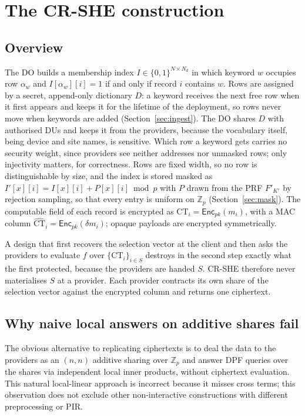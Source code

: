 \documentclass[a4paper,fleqn]{cas-sc}
\newcommand{\Enc}{\mathsf{Enc}}
\begin{document}
\section{The CR-SHE construction}
\label{sec:construction}

\subsection{Overview}
The DO builds a membership index $I\in\{0,1\}^{N\times N_d}$ in which keyword
$w$ occupies row $\alpha_w$ and $I[\alpha_w][i]=1$ if and only if record $i$
contains $w$. Rows are assigned by a secret, append-only dictionary $D$: a
keyword receives the next free row when it first appears and keeps it for the
lifetime of the deployment, so rows never move when keywords are added
(Section~\ref{sec:ingest}). The DO shares $D$ with authorised DUs and keeps it
from the providers, because the vocabulary itself, being device and site
names, is sensitive. Which row a keyword gets carries no security weight,
since providers see neither addresses nor unmasked rows; only injectivity
matters, for correctness. Rows are fixed width, so no row is distinguishable
by size, and the index is stored masked as $I'[x][i]=I[x][i]+P[x][i]\bmod p$
with $P$ drawn from the PRF $F'_{K'}$ by rejection sampling, so that every
entry is uniform on $\mathbb{Z}_p$ (Section~\ref{sec:mask}).
The computable field of each record is encrypted as
$\text{CT}_i=\Enc_{pk}(m_i)$, with a MAC column
$\widehat{\text{CT}}_i=\Enc_{pk}(\delta m_i)$; opaque payloads are encrypted
symmetrically.

A design that first recovers the selection vector at the client and then asks
the providers to evaluate $f$ over $\{\text{CT}_i\}_{i\in S}$ destroys in the
second step exactly what the first protected, because the providers are handed
$S$. CR-SHE therefore never materialises $S$ at a provider. Each provider
contracts its own share of the selection vector against the encrypted column
and returns one ciphertext.

\subsection{Why naive local answers on additive shares fail}
\label{sec:whyrep}
The obvious alternative to replicating ciphertexts is to deal the data to the
providers as an $(n,n)$ additive sharing over $\mathbb{Z}_p$ and answer DPF
queries over the shares via independent local inner products, without
ciphertext evaluation. This natural local-linear approach is incorrect
because it misses cross terms; this observation does not exclude other
non-interactive constructions with different preprocessing or PIR.
\end{document}
